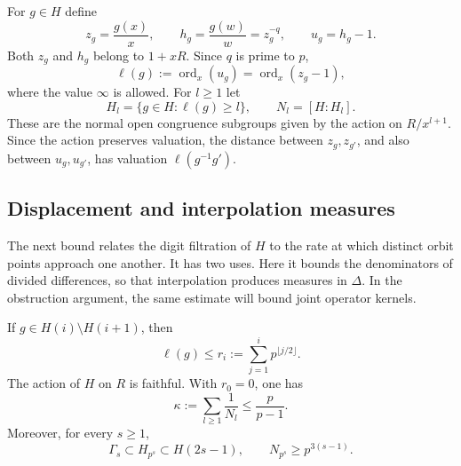 For $g\in H$ define
\begin{equation}
 z_g=\frac{g(x)}x,\qquad h_g=\frac{g(w)}w=z_g^{-q},
 \qquad u_g=h_g-1.
 \label{op:displacements}
\end{equation}
Both $z_g$ and $h_g$ belong to $1+xR$. Since $q$ is prime to $p$,
\[
 \ell(g):=\operatorname{ord}_x(u_g)
       =\operatorname{ord}_x(z_g-1),
\]
where the value $\infty$ is allowed. For $l\ge1$ let
\[
 H_l=\{g\in H:\ell(g)\ge l\},\qquad N_l=[H:H_l].
\]
These are the normal open congruence subgroups given by the action on
$R/x^{l+1}$. Since the action preserves valuation, the distance between
$z_g,z_{g'}$, and also between $u_g,u_{g'}$, has valuation
$\ell(g^{-1}g')$.

\subsection{Displacement and interpolation measures}

The next bound relates the digit filtration of $H$ to the rate at
which distinct orbit points approach one another. It has two uses.
Here it bounds the denominators of divided differences, so that
interpolation produces measures in $\Delta$. In the obstruction
argument, the same estimate will bound joint operator kernels.

\begin{lemma}
\label{op:displacement}
If $g\in H(i)\setminus H(i+1)$, then
\begin{equation}
 \ell(g)\le r_i:=\sum_{j=1}^i p^{\lfloor j/2\rfloor}.
 \label{op:digit-displacement}
\end{equation}
The action of $H$ on $R$ is faithful. With $r_0=0$, one has
\begin{equation}
 \kappa:=\sum_{l\ge1}\frac1{N_l}\le\frac p{p-1}.
 \label{op:kappa}
\end{equation}
Moreover, for every $s\ge1$,
\begin{equation}
 \Gamma_s\subset H_{p^s}\subset H(2s-1),
 \qquad N_{p^s}\ge p^{3(s-1)}.
 \label{op:congruence-index}
\end{equation}
\end{lemma}

